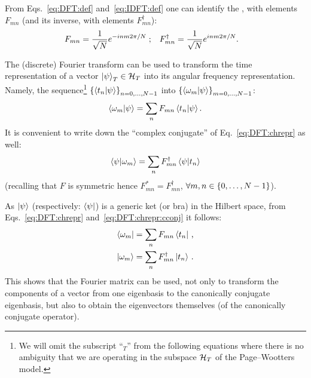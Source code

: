 From Eqs.~\eqref{eq:DFT:def} and~\eqref{eq:IDFT:def} one can identify the
, with elements $F_{mn}$
(and its inverse,
with elements $F_{mn}^{\dagger}$):
\begin{align}
  F_{mn}            &= \frac{1}{\sqrt{N}} e^{-i n m 2 \pi / N} \;\text{;} &
  F_{mn}^{\dagger}  &= \frac{1}{\sqrt{N}} e^{ i n m 2 \pi / N}
  \text{.}
\end{align}


The (discrete) Fourier transform can be used to transform the time representation
of a vector $\ket{\psi}_T \in \mathcal{H}_T$ into its angular frequency representation.
Namely, the sequence\footnote{
  We will omit the subscript ``${}_{T}$'' from the following equations
  where there is no ambiguity that
  we are operating in the subspace $\mathcal{H}_T$
  of the Page--Wootters model.
}
$\left\{\braket{t_n}{\psi}\right\}_{n=0, \dots, N-1}$ into
$\left\{\braket{\omega_m}{\psi}\right\}_{m=0, \dots, N-1}$:
\begin{equation}\label{eq:DFT:chrepr}  %
  \braket{\omega_{m}}{\psi} = \sum_n F_{mn} \braket{t_n}{\psi} \text{.}
\end{equation}
It is convenient to write down the ``complex conjugate'' of Eq.~\eqref{eq:DFT:chrepr} as well:
\begin{equation}\label{eq:DFT:chrepr:cconj}  %
  \braket{\psi}{\omega_{m}} = \sum_n F_{mn}^{\dagger} \braket{\psi}{t_n}
\end{equation}
(recalling that $F$ is symmetric hence
$F_{mn}^{*} = F_{mn}^{\dagger}$,
$\forall m,n \in \left\{0, \dots, N-1\right\}$).

As $\ket{\psi}$ (respectively: $\bra{\psi}$) is a generic ket (or bra) in the Hilbert space,
from Eqs.~\eqref{eq:DFT:chrepr} and~\eqref{eq:DFT:chrepr:cconj} it follows:
\begin{align}
  \label{eq:DFT:bra}  \bra{\omega_{m}} &= \sum_n F_{mn}           \bra{t_n} \,\text{,}  \\
  \label{eq:DFT:ket}  \ket{\omega_{m}} &= \sum_n F_{mn}^{\dagger} \ket{t_n} \,\text{.}
\end{align}
This shows that the Fourier matrix can be used, not only to transform the components
of a vector from one eigenbasis to the canonically conjugate eigenbasis,
but also to obtain the eigenvectors themselves (of the canonically conjugate operator).

